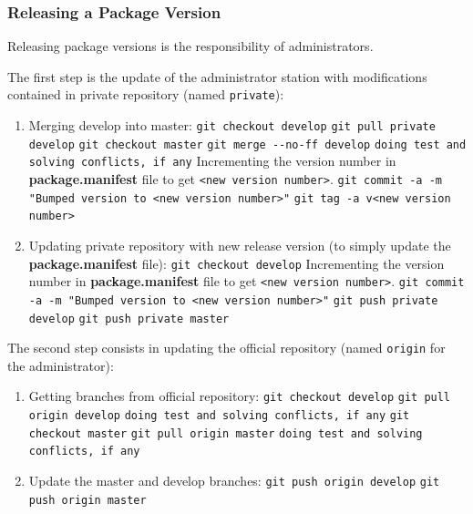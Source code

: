 \documentclass[12pt,a4paper]{article}
\begin{document}
\subsubsection{Releasing a Package Version}

Releasing package versions is the responsibility of administrators.

The first step is the update of the administrator station with modifications contained in private repository (named \texttt{private}):
\begin{enumerate}
\item Merging develop into master:
\linebreak \verb|git checkout develop|
\linebreak \verb|git pull private develop|
\linebreak \verb|git checkout master|
\linebreak \verb|git merge --no-ff develop|
\linebreak \verb|doing test and solving conflicts, if any|
\linebreak Incrementing the version number in \textbf{package.manifest} file to get \texttt{<new version number>}.
\linebreak \verb|git commit -a -m "Bumped version to <new version number>"|
\linebreak \verb|git tag -a v<new version number>|
\item Updating private repository with new release version (to simply update the \textbf{package.manifest} file):
\linebreak \verb|git checkout develop|
\linebreak Incrementing the version number in \textbf{package.manifest} file to get \texttt{<new version number>}.
\linebreak \verb|git commit -a -m "Bumped version to <new version number>"|
\linebreak \verb|git push private develop|
\linebreak \verb|git push private master|
\end{enumerate}

The second step consists in updating the official repository (named \texttt{origin} for the administrator):
\begin{enumerate}
\item Getting branches from official repository:
\linebreak \verb|git checkout develop|
\linebreak \verb|git pull origin develop|
\linebreak \verb|doing test and solving conflicts, if any|
\linebreak \verb|git checkout master|
\linebreak \verb|git pull origin master|
\linebreak \verb|doing test and solving conflicts, if any|
\item Update the master and develop branches:
\linebreak \verb|git push origin develop|
\linebreak \verb|git push origin master|
\end{enumerate}
\end{document}
